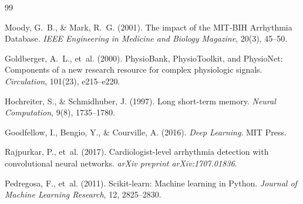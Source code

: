 \documentclass[twocolumn, fontsize=10pt]{article}
\begin{document}

\begin{thebibliography}{99}

Moody, G.~B., \& Mark, R.~G. (2001).
\newblock The impact of the MIT-BIH Arrhythmia Database.
\newblock \textit{IEEE Engineering in Medicine and Biology Magazine}, 20(3), 45--50.

Goldberger, A.~L., et~al. (2000).
\newblock PhysioBank, PhysioToolkit, and PhysioNet: Components of a new research resource for complex physiologic signals.
\newblock \textit{Circulation}, 101(23), e215--e220.

Hochreiter, S., \& Schmidhuber, J. (1997).
\newblock Long short-term memory.
\newblock \textit{Neural Computation}, 9(8), 1735--1780.

Goodfellow, I., Bengio, Y., \& Courville, A. (2016).
\newblock \textit{Deep Learning}.
\newblock MIT Press.

Rajpurkar, P., et~al. (2017).
\newblock Cardiologist-level arrhythmia detection with convolutional neural networks.
\newblock \textit{arXiv preprint arXiv:1707.01836}.

Pedregosa, F., et~al. (2011).
\newblock Scikit-learn: Machine learning in Python.
\newblock \textit{Journal of Machine Learning Research}, 12, 2825--2830.

\end{thebibliography}
\end{document}
